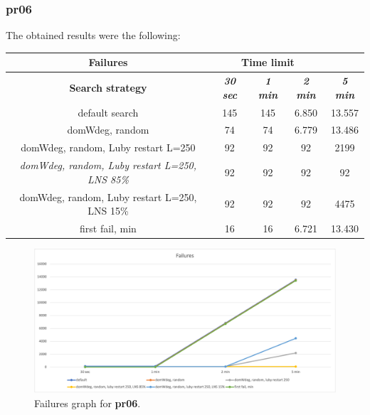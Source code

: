 \subsubsection{pr06}
The obtained results were the following:
{
\renewcommand{\arraystretch}{2}
\begin{longtable}[h]{| c | c | c | c | c |}
    \hline
    \textbf{Failures} & \multicolumn{3}{c}{Time limit} & \\
    \hline
    \textbf{Search strategy} & \textbf{\textit{30 sec}} & \textbf{\textit{1 min}} & \textbf{\textit{2 min}} & \textbf{\textit{5 min}} \\
    \hline
    \endhead
    default search                                         & 145 &  145 &  6.850 &  13.557 \\
    \hline
    domWdeg, random                                        &  74 &   74 &  6.779 &  13.486 \\
    \hline
    domWdeg, random, Luby restart L=250                    &  92 &   92 &   92 &    2199 \\
    \hline
    \textit{domWdeg, random, Luby restart L=250, LNS 85\%} &  92 &   92 &   92 &      92 \\
    \hline
    domWdeg, random, Luby restart L=250, LNS 15\%          &  92 &   92 &   92 &    4475 \\
    \hline
    first fail, min                                        &  16 &   16 & 6.721 &   13.430 \\
    \hline
\end{longtable}
}
\begin{figure}[H]
    \centering
    \includegraphics[width=0.8\columnwidth]{../graphs/pr06-failures.png}
    \caption{Failures graph for \textbf{pr06}.}
\end{figure}

